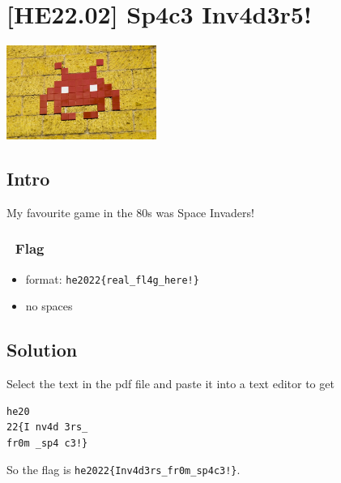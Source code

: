 
\hypertarget{he22.02}{%
\chapter{[HE22.02] Sp4c3 Inv4d3r5!}\label{he22.02}}

\begin{marginfigure}
	\includegraphics[width=49mm]{level2/challenge2.jpg}
\end{marginfigure}
\section{Intro}
My favourite game in the 80s was Space Invaders!

\subsection{{\NotoEmoji 🚩} Flag}
\begin{itemize}
	\item format: \verb+he2022{real_fl4g_here!}+
	\item no spaces
\end{itemize}

\section{Solution}\label{hv21.02-solution}

Select the text in the pdf file and paste it into a text editor to get
\begin{verbatim}he20
22{I nv4d 3rs_
fr0m _sp4 c3!}
\end{verbatim}

So the flag is \verb+he2022{Inv4d3rs_fr0m_sp4c3!}+.

